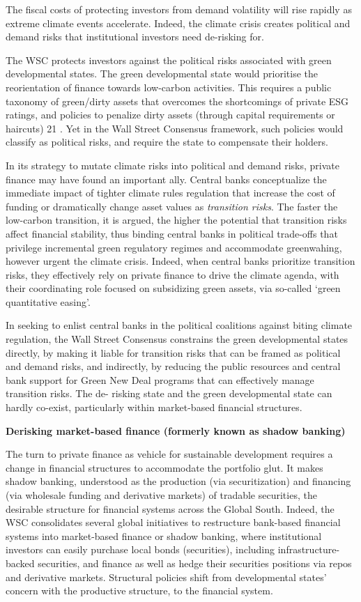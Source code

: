 \documentclass[
]{book}
\begin{document}
The fiscal costs of protecting investors from demand volatility will rise rapidly as
extreme climate events accelerate. Indeed, the climate crisis creates political and
demand risks that institutional investors need de-risking for.

The WSC protects investors against the political risks associated with green
developmental states. The green developmental state would prioritise the reorientation
of finance towards low-carbon activities. This requires a public taxonomy of green/dirty
assets that overcomes the shortcomings of private ESG ratings, and policies to penalize
dirty assets (through capital requirements or haircuts) 21 . Yet in the Wall Street
Consensus framework, such policies would classify as political risks, and require the
state to compensate their holders.

In its strategy to mutate climate risks into political and demand risks, private finance
may have found an important ally. Central banks conceptualize the immediate impact
of tighter climate rules regulation that increase the cost of funding or dramatically
change asset values as \emph{transition risks}.
The faster the low-carbon
transition, it is argued, the higher the potential that transition risks affect financial
stability, thus binding central banks in political trade-offs that privilege incremental
green regulatory regimes and accommodate greenwahing, however urgent the climate
crisis. Indeed, when central banks prioritize transition risks, they effectively rely on
private finance to drive the climate agenda, with their coordinating role focused on
subsidizing green assets, via so-called `green quantitative easing'.

In seeking to enlist central banks in the political coalitions against biting climate
regulation, the Wall Street Consensus constrains the green developmental states
directly, by making it liable for transition risks that can be framed as political and
demand risks, and indirectly, by reducing the public resources and central bank support
for Green New Deal programs that can effectively manage transition risks. The de-
risking state and the green developmental state can hardly co-exist, particularly within
market-based financial structures.

\textbf{Derisking market-based finance (formerly known as shadow banking)}

The turn to private finance as vehicle for sustainable development requires a change in
financial structures to accommodate the portfolio glut. It makes shadow banking,
understood as the production (via securitization) and financing (via wholesale funding
and derivative markets) of tradable securities, the desirable structure for financial
systems across the Global South. Indeed, the WSC consolidates
several global initiatives to restructure bank-based financial systems into market-based
finance or shadow banking,
where institutional investors can easily purchase local bonds (securities), including
infrastructure-backed securities, and finance as well as hedge their securities positions
via repos and derivative markets. Structural policies shift from developmental states'
concern with the productive structure, to the financial system.
\end{document}
